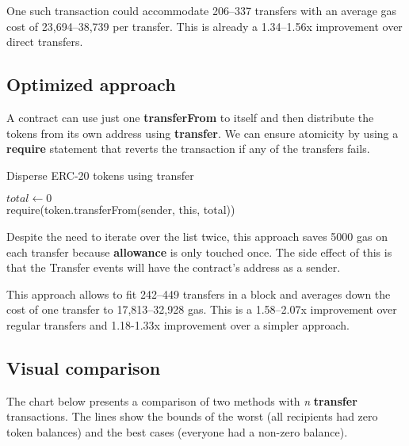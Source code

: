 \documentclass[12pt]{article}
\begin{document}
One such transaction could accommodate 206--337 transfers with an average gas cost of 23,694--38,739 per transfer. 
This is already a 1.34--1.56x improvement over direct transfers.

\subsection{Optimized approach}

A contract can use just one \textbf{transferFrom} to itself and then distribute the tokens from its own address using \textbf{transfer}. We can ensure atomicity by using a \textbf{require} statement that reverts the transaction if any of the transfers fails.

\begin{algorithm}[h]
	\caption{Disperse ERC-20 tokens using transfer}
	\BlankLine
	$total \leftarrow 0$ \\
	\For{$i \in [0 \dots recipients.length)$}{
		$total \leftarrow total + values[i]$
	}
	require(token.transferFrom(sender, this, total)) \\
	\For{$i \in [0 \dots recipients.length)$}{
		require(token.transfer(this, recipients[i], values[i]))
	}
\end{algorithm}

Despite the need to iterate over the list twice, this approach saves 5000 gas on each transfer because \textbf{allowance} is only touched once.
The side effect of this is that the Transfer events will have the contract's address as a sender.

This approach allows to fit 242--449 transfers in a block and averages down the cost of one transfer to 17,813--32,928 gas.
This is a 1.58--2.07x improvement over regular transfers and 1.18-1.33x improvement over a simpler approach.

\subsection{Visual comparison}

The chart below presents a comparison of two methods with \textit{n} \textbf{transfer} transactions.
The lines show the bounds of the worst (all recipients had zero token balances) and the best cases (everyone had a non-zero balance).
\end{document}
